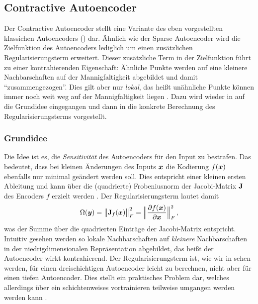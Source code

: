 \subsection{Contractive Autoencoder}
\label{ch:MethodenDerDimRed:ML:CAE}

Der Contractive Autoencoder \parencite{Rifai.2011} stellt eine Variante des eben vorgestellten klassichen Autoencoders
() dar. Ähnlich wie der Sparse Autoencoder wird die
Zielfunktion des Autoencoders lediglich um einen zusätzlichen Regularisierungsterm erweitert.
Dieser zusätzliche Term in der Zielfunktion führt zu einer kontrahierenden Eigenschaft: Ähnliche
Punkte werden auf eine kleinere Nachbarschaften auf der Mannigfaltigkeit abgebildet und damit
\enquote{zusammengezogen}. Dies gilt aber nur \textit{lokal}, das heißt unähnliche Punkte können
immer noch weit weg auf der Mannigfaltigkeit liegen \parencite[521]{Goodfellow.2016}. Dazu wird wieder in 
auf die Grundidee eingegangen und dann in 
die konkrete Berechnung des Regularisierungsterms vorgestellt.

\subsubsection{Grundidee}
\label{ch:MethodenDerDimRed:CAE:Grundidee}
Die Idee ist
es, die \textit{Sensitivität} des Autoencoders für den Input zu bestrafen. Das bedeutet, dass bei
kleinen Änderungen des Inputs $\bm{x}$ die Kodierung $f(\bm{x})$ ebenfalls nur minimal geändert
werden soll. Dies entspricht einer kleinen ersten Ableitung und kann über die (quadrierte)
Frobeniusnorm der Jacobi-Matrix $\mathbf{J}$ des Encoders $f$ erzielt werden \parencites[2]{Rifai.2011}[521]{Goodfellow.2016}. Der Regularisierungsterm lautet damit
\begin{equation}
	\label{eq:CAE-Regularisierung}
	\Omega(\vect{y}) = \norm[\big]{\mat{J}_f(\vect{x})}_F^2 =  \norm[\Big]{ \frac{\partial f(\vect{x})}{\partial \vect{x}} }^2_F \, ,
\end{equation}
was der Summe über die quadrierten Einträge der Jacobi-Matrix entspricht. Intuitiv gesehen werden so lokale Nachbarschaften auf \textit{kleinere} Nachbarschaften in der niedrigdimensionalen Repräsentation abgebildet, das heißt der Autoencoder wirkt kontrahierend.
Der Regularisierungsterm ist, wie wir in  sehen werden, für einen dreischichtigen Autoencoder leicht zu berechnen, nicht aber für einen tiefen Autoencoder. Dies stellt ein praktisches Problem dar, welches allerdings über ein schichtenweises vortrainieren teilweise umgangen werden werden kann \parencite[vgl.][522]{Goodfellow.2016}.

